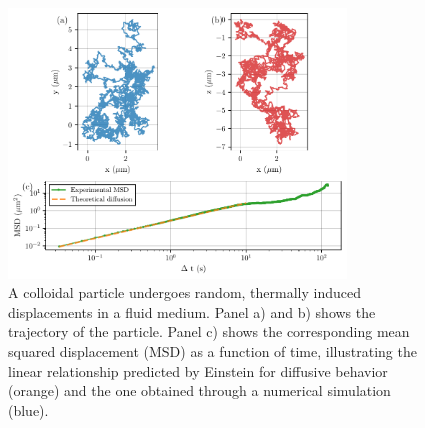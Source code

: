 \begin{figure}[H]
  \begin{center}
    \includegraphics[width=0.8\textwidth]{figures/passivebrowniantrajectory.pdf}
  \end{center}
  \caption[Example of brownian motion]{A colloidal particle undergoes random, thermally induced displacements in a fluid medium. Panel a) and b) shows the trajectory of the particle. Panel c) shows the corresponding mean squared displacement (MSD) as a function of time, illustrating the linear relationship predicted by Einstein for diffusive behavior (orange) and the one obtained through a numerical simulation (blue).}\label{fig:passivebrowniantrajectory}
\end{figure}


